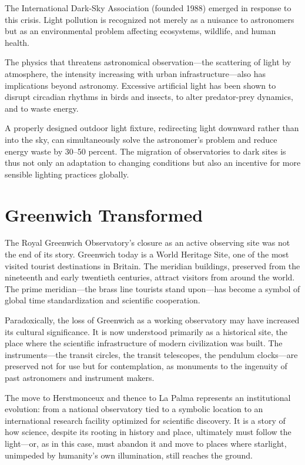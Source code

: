 The International Dark-Sky Association (founded 1988) emerged in response to this crisis. Light pollution is recognized not merely as a nuisance to astronomers but as an environmental problem affecting ecosystems, wildlife, and human health.

The physics that threatens astronomical observation—the scattering of light by atmosphere, the intensity increasing with urban infrastructure—also has implications beyond astronomy. Excessive artificial light has been shown to disrupt circadian rhythms in birds and insects, to alter predator-prey dynamics, and to waste energy.

A properly designed outdoor light fixture, redirecting light downward rather than into the sky, can simultaneously solve the astronomer's problem and reduce energy waste by 30–50 percent. The migration of observatories to dark sites is thus not only an adaptation to changing conditions but also an incentive for more sensible lighting practices globally.

\section{Greenwich Transformed}

The Royal Greenwich Observatory's closure as an active observing site was not the end of its story. Greenwich today is a World Heritage Site, one of the most visited tourist destinations in Britain. The meridian buildings, preserved from the nineteenth and early twentieth centuries, attract visitors from around the world. The prime meridian—the brass line tourists stand upon—has become a symbol of global time standardization and scientific cooperation.

Paradoxically, the loss of Greenwich as a working observatory may have increased its cultural significance. It is now understood primarily as a historical site, the place where the scientific infrastructure of modern civilization was built. The instruments—the transit circles, the transit telescopes, the pendulum clocks—are preserved not for use but for contemplation, as monuments to the ingenuity of past astronomers and instrument makers.

The move to Herstmonceux and thence to La Palma represents an institutional evolution: from a national observatory tied to a symbolic location to an international research facility optimized for scientific discovery. It is a story of how science, despite its rooting in history and place, ultimately must follow the light—or, as in this case, must abandon it and move to places where starlight, unimpeded by humanity's own illumination, still reaches the ground.
